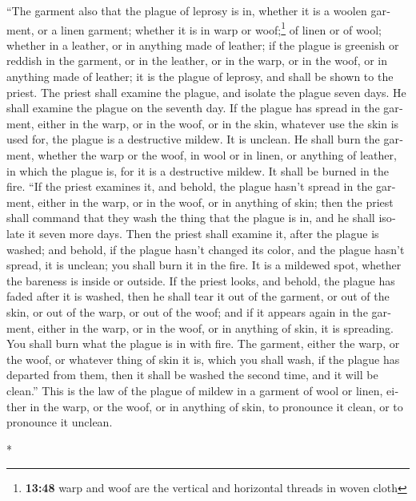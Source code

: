 \begin{paracol}{2}
\begin{otherlanguage}{english}
 ``The garment also that the plague of leprosy is in,
whether it is a woolen garment, or a linen garment; 
whether it is in warp or woof;\footnote{\textbf{13:48} warp and woof are
  the vertical and horizontal threads in woven cloth} of linen or of
wool; whether in a leather, or in anything made of leather;
 if the plague is greenish or reddish in the garment, or
in the leather, or in the warp, or in the woof, or in anything made of
leather; it is the plague of leprosy, and shall be shown to the priest.
 The priest shall examine the plague, and isolate the
plague seven days.  He shall examine the plague on the
seventh day. If the plague has spread in the garment, either in the
warp, or in the woof, or in the skin, whatever use the skin is used for,
the plague is a destructive mildew. It is unclean.  He
shall burn the garment, whether the warp or the woof, in wool or in
linen, or anything of leather, in which the plague is, for it is a
destructive mildew. It shall be burned in the fire.  ``If
the priest examines it, and behold, the plague hasn't spread in the
garment, either in the warp, or in the woof, or in anything of skin;
 then the priest shall command that they wash the thing
that the plague is in, and he shall isolate it seven more days.
 Then the priest shall examine it, after the plague is
washed; and behold, if the plague hasn't changed its color, and the
plague hasn't spread, it is unclean; you shall burn it in the fire. It
is a mildewed spot, whether the bareness is inside or outside.
 If the priest looks, and behold, the plague has faded
after it is washed, then he shall tear it out of the garment, or out of
the skin, or out of the warp, or out of the woof;  and if
it appears again in the garment, either in the warp, or in the woof, or
in anything of skin, it is spreading. You shall burn what the plague is
in with fire.  The garment, either the warp, or the woof,
or whatever thing of skin it is, which you shall wash, if the plague has
departed from them, then it shall be washed the second time, and it will
be clean.''  This is the law of the plague of mildew in a
garment of wool or linen, either in the warp, or the woof, or in
anything of skin, to pronounce it clean, or to pronounce it unclean.

\end{otherlanguage}

\switchcolumn[0]*


\end{paracol}
